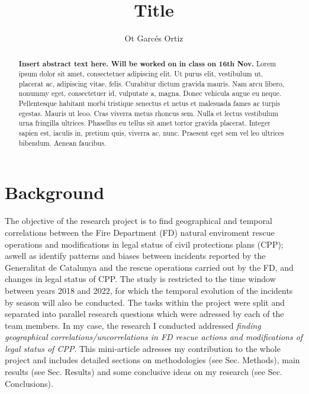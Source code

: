 \documentclass[
  journal=small,
  manuscript=mini-article,  %
  year=2023,
  volume=1,
]{odj-journal}
\title{Title}
\author{Ot Garcés Ortiz}
\affiliation{Departament de Física de la Matèria Condensada,  Barcelona, Spain.}
\begin{document}
\begin{abstract}
\textbf{Insert abstract text here. Will be worked on in class on 16th Nov.} Lorem ipsum dolor sit amet, consectetuer adipiscing elit. Ut purus elit, vestibulum ut, placerat ac, adipiscing vitae, felis. Curabitur dictum gravida mauris. Nam arcu libero, nonummy eget, consectetuer id, vulputate a, magna. Donec vehicula augue eu neque. Pellentesque habitant morbi tristique senectus et netus et malesuada fames ac turpis egestas. Mauris ut leoo. Cras viverra metus rhoncus
sem. Nulla et lectus vestibulum urna fringilla ultrices. Phasellus eu tellus sit amet
tortor gravida placerat. Integer sapien est, iaculis in, pretium quis, viverra ac, nunc.
Praesent eget sem vel leo ultrices bibendum. Aenean faucibus.
\end{abstract}
\vspace{-1cm}
\section{Background}
The objective of the research project is to find geographical and temporal correlations between the Fire Department (FD) natural enviroment rescue operations and modifications in legal status of civil protections plans (CPP); aswell as identify patterns and biases between incidents reported by the Generalitat de Catalunya and the rescue operations carried out by the FD, and changes in legal status of CPP. The study is restricted to the time window between years 2018 and 2022, for which the temporal evolution of the incidents by season will also be conducted. The tasks within the project were split and separated into parallel research questions which were adressed by each of the team members. In my case, the research I conducted addressed \textit{finding geographical correlations/uncorrelations in FD rescue actions and modifications of legal status of CPP}. This mini-article adresses my contribution to the whole project and includes detailed sections on methodologies (see Sec. Methods), main results (see Sec. Results) and some conclusive ideas on my research (see Sec. Conclusions). \\
\end{document}
